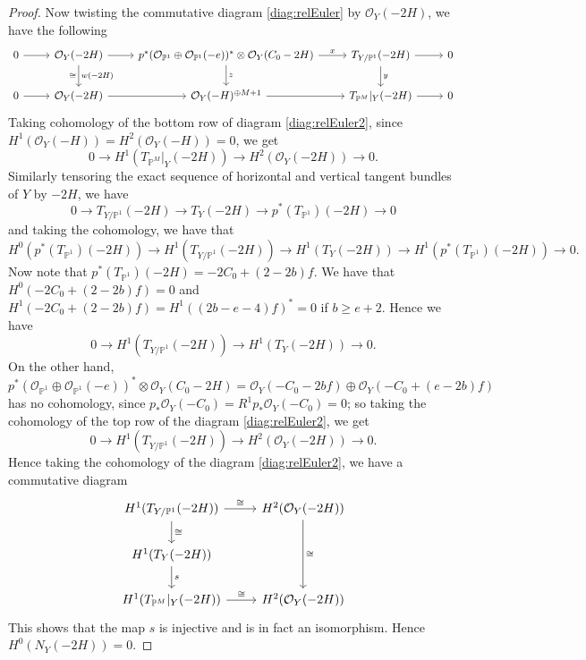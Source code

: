 \documentclass[11pt,reqno]{amsart}
\theoremstyle{plain}
\theoremstyle{definition}
\newcommand{\PP}{\mathbb{P}}
\newcommand{\PM}{\mathbb{P}^M}
\newcommand{\OO}{\mathcal{O}}
\newcommand{\NY}{N_{Y}}
\newcommand{\TP}{T_{\PM}|_Y}
\begin{document}
\begin{proof}
Now twisting the commutative diagram \eqref{diag:relEuler} by $\OO_Y(-2H)$, we have the following
\begin{equation}\label{diag:relEuler2}
\begin{tikzcd}
  0 \arrow[r] & \OO_Y(-2H) \arrow[r] \arrow[d, "w(-2H)", "\cong"'] & p^*(\OO_{\PP^1} \oplus \OO_{\PP^1}(-e))^* \otimes \OO_Y(C_0-2H) \arrow[r, "x"] \arrow[d, "z"] & T_{Y/\PP^1}(-2H) \arrow[r] \arrow[d, "y"] & 0 \\
   0 \arrow[r] & \OO_Y(-2H) \arrow[r] & \OO_Y(-H)^{\oplus M+1} \arrow[r] & \TP(-2H) \arrow[r] & 0
\end{tikzcd}
\end{equation}
Taking cohomology of the bottom row of diagram \eqref{diag:relEuler2}, since $H^1(\OO_Y(-H))=H^2(\OO_Y(-H))=0$, we get
\[
0\to H^1(\TP(-2H))\to H^2(\OO_Y(-2H))\to0 .
\]
Similarly tensoring the exact sequence of horizontal and vertical tangent bundles of $Y$ by $-2H$, we have
\[
0\to T_{Y/\PP^1}(-2H)\to T_Y(-2H)\to p^*(T_{\PP^1})(-2H)\to0
\]
and taking the cohomology, we have that
\[
H^0(p^*(T_{\PP^1})(-2H))\to H^1(T_{Y/\PP^1}(-2H))\to H^1(T_Y(-2H))\to H^1(p^*(T_{\PP^1})(-2H))\to0 .
\]
Now note that $p^*(T_{\PP^1})(-2H)=-2C_0+(2-2b)f$. We have that $H^0(-2C_0+(2-2b)f)=0$ and $H^1(-2C_0+(2-2b)f)=H^1((2b-e-4)f)^*=0$ if $b\ge e+2$. Hence we have
\[
0\to H^1(T_{Y/\PP^1}(-2H))\to H^1(T_Y(-2H))\to0 .
\]
On the other hand, $p^*(\OO_{\PP^1}\oplus\OO_{\PP^1}(-e))^*\otimes\OO_Y(C_0-2H)=\OO_Y(-C_0-2bf)\oplus\OO_Y(-C_0+(e-2b)f)$ has no cohomology, since $p_*\OO_Y(-C_0)=R^1p_*\OO_Y(-C_0)=0$; so taking the cohomology of the top row of the diagram \eqref{diag:relEuler2}, we get
\[
0\to H^1(T_{Y/\PP^1}(-2H))\to H^2(\OO_Y(-2H))\to0 .
\]
Hence taking the cohomology of the diagram \eqref{diag:relEuler2}, we have a commutative diagram
\[
\begin{tikzcd}
    H^1(T_{Y/\PP^1}(-2H)) \arrow[d, "\cong"] \arrow[r, "\cong"] & H^2(\OO_Y(-2H)) \arrow[dd, "\cong"] \\
     H^1(T_{Y}(-2H)) \arrow[d, "s"] & \\
     H^1(\TP(-2H)) \arrow[r, "\cong"] & H^2(\OO_Y(-2H))
\end{tikzcd}
\]
This shows that the map $s$ is injective and is in fact an isomorphism. Hence $H^0(\NY(-2H))=0$.
\smallskip


\end{proof}
\end{document}
